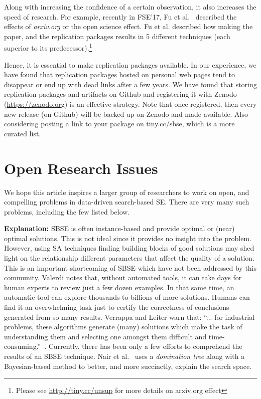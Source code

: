 \documentclass[sigconf,anonymous,review]{acmart}
\begin{document}
Along with increasing the confidence of a certain observation, it also increases the speed of research. For example, recently in FSE'17, Fu et al.~\cite{fu2017revisiting} described the effects of \textit{arxiv.org} or the open science effect. Fu et al. described how making the paper, and the replication packages results in 5 different techniques (each superior to its predecessor).\footnote{Please see \url{http://tiny.cc/unsup}  for more details on arxiv.org effect} 

Hence, it is essential to make replication packages available. 
In our experience, we have found that replication packages hosted on personal web pages tend to disappear or end up with dead links after a few years.
We have found that storing replication packages and artifacts on Github and registering it with Zenodo (\href{https://zenodo.org}{https://zenodo.org}) is an effective strategy. 
Note that once registered, then every new release (on Github) will be backed up on Zenodo and made available. Also considering posting a link to your package on tiny.cc/sbse, which is a more curated list. 
    
     


\section{Open Research Issues} \label{sec:open}
We hope this article inspires a larger group of researchers to work
on open, and compelling problems
in data-driven search-based SE. There are very many such problems, including the few listed below.


  \noindent\textbf{Explanation: } SBSE is often instance-based and provide optimal or (near) optimal solutions. This is not ideal since it provides no insight into the problem. However, using SA techniques finding
building blocks of good solutions may shed light on the relationship
different parameters that affect the quality of a solution. This is an important shortcoming of SBSE which have not been addressed by this community. Valerdi
notes that, without automated tools, it can take days for human
experts to review just a few dozen examples. In that same
time, an automatic tool can explore thousands to billions of more
solutions. Humans can find it an overwhelming task just to
certify the correctness of conclusions generated from so many
results. Verrappa and Leiter warn that:
``... for industrial problems, these algorithms generate
(many) solutions which make the task of understanding
them and selecting one amongst them difficult
and time-consuming.''~\cite{veerappa2011understanding}. Currently, there has been only a few efforts to comprehend the results of an SBSE technique. Nair et al.~\cite{nair2017flash}
uses a \textit{domination tree} along with a Bayesian-based method to better, and more succinctly,
explain the search space. 
\end{document}
